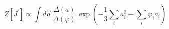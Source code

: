 \begin{equation}
Z[J^{\prime}]\propto \int d\vec{a}\, \frac{\Delta(a)}{\Delta{(\varphi)}} \,
\exp\left( -\frac{1}{3}\sum_{i} a_i^3 -\sum_{i} \varphi_i a_i \right)
\end{equation}


